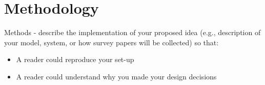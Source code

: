 \section{Methodology}

Methods - describe the implementation of your proposed idea (e.g., description of your model, system, or how survey papers will be collected) so that:
\begin{itemize}
    \item A reader could reproduce your set-up
    \item A reader could understand why you made your design decisions
\end{itemize}

